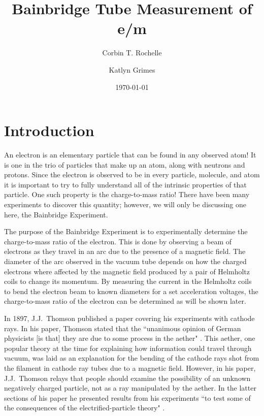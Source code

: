 \documentclass[aps,prl,10pt,twocolumn,floatfix]{revtex4-2}
\begin{document}
\begin{abstract}
\end{abstract}


\title{Bainbridge Tube Measurement of e/m}
\author{Corbin T. Rochelle}
\author{Katlyn Grimes}
\date{\today}

\maketitle

\section{Introduction}\label{Intro}

An electron is an elementary particle that can be found in any observed atom!
It is one in the trio of particles that make up an atom, along with neutrons and protons.
Since the electron is observed to be in every particle, molecule, and atom it is important to try to fully understand all of the intrinsic properties of that particle. 
One such property is the charge-to-mass ratio!
There have been many experiments to discover this quantity; however, we will only be discussing one here, the Bainbridge Experiment.  

The purpose of the Bainbridge Experiment is to experimentally determine the charge-to-mass ratio of the electron.
This is done by observing a beam of electrons as they travel in an arc due to the presence of a magnetic field\cite{WingerBain}.
The diameter of the arc observed in the vacuum tube depends on how the charged electrons where affected by the magnetic field produced by a pair of Helmholtz coils to change its momentum.
By measuring the current in the Helmholtz coils to bend the electron beam to known diameters for a set acceleration voltages, the charge-to-mass ratio of the electron can be determined as will be shown later.

In 1897, J.J.~Thomson published a paper covering his experiments with cathode rays.
In his paper, Thomson stated that the ``unanimous opinion of German physicists [is that] they are due to some process in the aether" \cite{CathodeRays}.
This aether, one popular theory at the time for explaining how information could travel through vacuum, was laid as an explanation for the bending of the cathode rays shot from the filament in cathode ray tubes due to a magnetic field.
However, in his paper, J.J.~Thomson relays that people should examine the possibility of an unknown negatively charged particle, not as a ray manipulated by the aether.
In the latter sections of his paper he presented results from his experiments ``to test some of the consequences of the electrified-particle theory" \cite{CathodeRays}.
\end{document}
